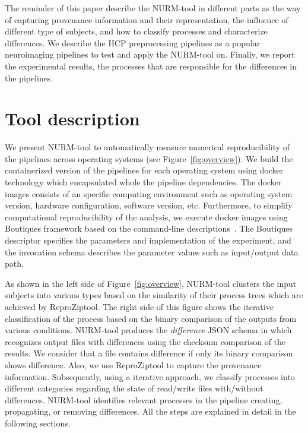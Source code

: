 \documentclass[a4paper,num-refs]{oup-contemporary}
\newcommand{\reprozip}[0]{ReproZip}
\begin{document}
The reminder of this paper describe the NURM-tool in different parts as 
the way of capturing provenance information and their representation, 
the influence of different type of subjects, and how to classify 
processes and characterize differences. We describe the HCP preprocessing 
pipelines as a popular neuroimaging pipelines to test and apply the 
NURM-tool on. Finally, we report the experimental results, the processes 
that are responsible for the differences in the pipelines.


\section{Tool description}

We present NURM-tool to automatically
measure numerical reproducibility of the pipelines across operating 
systems (see Figure~\ref{fig:overview}). We build the 
containerized version of the pipelines for each operating system using 
docker technology which encapsulated whole the pipeline dependencies. 
The docker images consists of an specific computing environment such as 
operating system version, hardware configuration, software version, 
etc. Furthermore, to simplify computational reproducibility of the 
analysis, we execute docker images using Boutiques framework based on 
the command-line descriptions~\cite{glatard2017boutiques}. The 
Boutiques descriptor specifies the parameters and implementation of the 
experiment, and the invocation schema describes the parameter values 
such as input/output data path.

As shown in the left side of Figure~\ref{fig:overview}, NURM-tool clusters 
the input subjects into various types based on the similarity of their 
process trees which are achieved by \reprozip tool. The right side of this figure 
shows the iterative classification of the process based on the binary 
comparison of the outputs from various conditions.
NURM-tool produces the \textit{difference} JSON schema in which 
recognizes output files with differences using the checksum comparison 
of the results. We consider that a file contains difference if only 
its binary comparison shows difference. Also, 
we use \reprozip tool to capture the provenance information. 
Subsequently, using a iterative approach, we classify processes into 
different categories regarding the state of read/write files 
with/without differences. NURM-tool identifies relevant processes in the 
pipeline creating, propagating, or removing differences. 
All the steps are explained in detail in the following sections.
\end{document}
